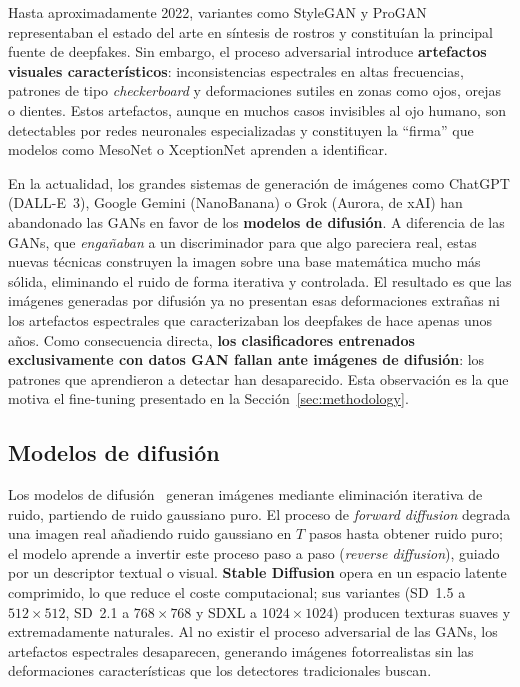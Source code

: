 \documentclass[pdflatex,sn-mathphys-num]{sn-jnl}
\begin{document}
Hasta aproximadamente 2022, variantes como StyleGAN y ProGAN representaban el estado del arte en síntesis de rostros y constituían la principal fuente de deepfakes. Sin embargo, el proceso adversarial introduce \textbf{artefactos visuales característicos}: inconsistencias espectrales en altas frecuencias, patrones de tipo \emph{checkerboard} y deformaciones sutiles en zonas como ojos, orejas o dientes. Estos artefactos, aunque en muchos casos invisibles al ojo humano, son detectables por redes neuronales especializadas y constituyen la ``firma'' que modelos como MesoNet o XceptionNet aprenden a identificar.

En la actualidad, los grandes sistemas de generación de imágenes como ChatGPT (DALL-E~3), Google Gemini (NanoBanana) o Grok (Aurora, de xAI) han abandonado las GANs en favor de los \textbf{modelos de difusión}. A diferencia de las GANs, que \emph{engañaban} a un discriminador para que algo pareciera real, estas nuevas técnicas construyen la imagen sobre una base matemática mucho más sólida, eliminando el ruido de forma iterativa y controlada. El resultado es que las imágenes generadas por difusión ya no presentan esas deformaciones extrañas ni los artefactos espectrales que caracterizaban los deepfakes de hace apenas unos años. Como consecuencia directa, \textbf{los clasificadores entrenados exclusivamente con datos GAN fallan ante imágenes de difusión}: los patrones que aprendieron a detectar han desaparecido. Esta observación es la que motiva el fine-tuning presentado en la Sección~\ref{sec:methodology}.

\subsection{Modelos de difusión}\label{subsec:diffusion}

Los modelos de difusión~\cite{rombach2022latentdiffusion, ho2020ddpm} generan imágenes mediante eliminación iterativa de ruido, partiendo de ruido gaussiano puro. El proceso de \emph{forward diffusion} degrada una imagen real añadiendo ruido gaussiano en $T$ pasos hasta obtener ruido puro; el modelo aprende a invertir este proceso paso a paso (\emph{reverse diffusion}), guiado por un descriptor textual o visual. \textbf{Stable Diffusion} opera en un espacio latente comprimido, lo que reduce el coste computacional; sus variantes (SD~1.5 a $512\times512$, SD~2.1 a $768\times768$ y SDXL a $1024\times1024$) producen texturas suaves y extremadamente naturales. Al no existir el proceso adversarial de las GANs, los artefactos espectrales desaparecen, generando imágenes fotorrealistas sin las deformaciones características que los detectores tradicionales buscan.
\end{document}
